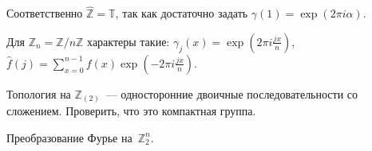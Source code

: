 \documentclass{article}
\begin{document}
Соответственно $\hat{\mathbb{Z}} = \mathbb{T}$, так как достаточно задать
$\gamma(1) = \exp(2\pi i\alpha)$.

Для $\mathbb{Z}_n = \mathbb{Z} / n\mathbb{Z}$ характеры такие: $\gamma_j(x) =
\exp(2\pi i \frac{jx}{n})$, $\hat f(j) = \sum\limits_{x=0}^{n-1} f(x) \exp(-2\pi
i \frac{jx}{n})$.

\begin{exercise}
	Топология на $\mathbb{Z}_{(2)}$~--- односторонние двоичные последовательности
	со сложением. Проверить, что это компактная группа.
\end{exercise}
\begin{exercise}
	Преобразование Фурье на~$\mathbb{Z}_2^n$.
\end{exercise}
\end{document}
